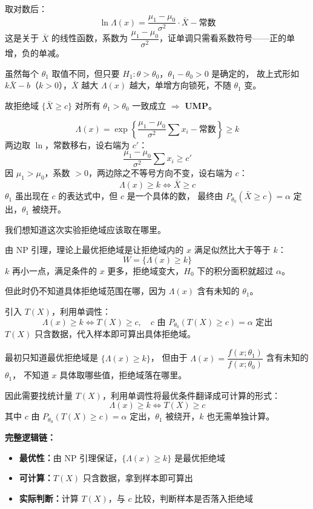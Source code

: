 \begin{note}[单调性的证明]
取对数后：
\[
\ln \Lambda(x) = \frac{\mu_1 - \mu_0}{\sigma^2} \cdot \bar{X} - \text{常数}
\]
这是关于 $\bar{X}$ 的线性函数，系数为 $\dfrac{\mu_1-\mu_0}{\sigma^2}$，证单调只需看系数符号——正的单增，负的单减。

虽然每个 $\theta_1$ 取值不同，但只要 $H_1: \theta > \theta_0$，$\theta_1 - \theta_0 > 0$ 是确定的，
故上式形如 $k\bar{X} - b$（$k > 0$），$\bar{X}$ 越大 $\Lambda(x)$ 越大，单增方向锁死，不随 $\theta_1$ 变。

故拒绝域 $\{\bar{X} \geq c\}$ 对所有 $\theta_1 > \theta_0$ 一致成立 $\Rightarrow$ \textbf{UMP}。
\end{note}




\begin{note}[似然比化简为拒绝域]
\[
\Lambda(x) = \exp\!\left\{\frac{\mu_1-\mu_0}{\sigma^2}\sum x_i - \text{常数}\right\} \geq k
\]
两边取 $\ln$，常数移右，设右端为 $c'$：
\[
\frac{\mu_1-\mu_0}{\sigma^2}\sum x_i \geq c'
\]
因 $\mu_1 > \mu_0$，系数 $> 0$，两边除之不等号方向不变，设右端为 $c$：
\[
\Lambda(x) \geq k \iff \bar{X} \geq c
\]
$\theta_1$ 虽出现在 $c$ 的表达式中，但 $c$ 是一个具体的数，
最终由 $P_{\theta_0}(\bar{X} \geq c) = \alpha$ 定出，$\theta_1$ 被绕开。
\end{note}
\begin{dxtips}[NP到UMP的完整逻辑]
我们想知道这次实验拒绝域应该取在哪里。

由 NP 引理，理论上最优拒绝域是让拒绝域内的 $x$ 满足似然比大于等于 $k$：
\[
W = \{\Lambda(x) \geq k\}
\]
$k$ 再小一点，满足条件的 $x$ 更多，拒绝域变大，$H_0$ 下的积分面积就超过 $\alpha$。

但此时仍不知道具体拒绝域范围在哪，因为 $\Lambda(x)$ 含有未知的 $\theta_1$。

引入 $T(X)$，利用单调性：
\[
\Lambda(x) \geq k \iff T(X) \geq c, \quad c \text{ 由 } P_{\theta_0}(T(X) \geq c) = \alpha \text{ 定出}
\]
$T(X)$ 只含数据，代入样本即可算出具体拒绝域。
\end{dxtips}
\begin{note}[从似然比到可用拒绝域]
最初只知道最优拒绝域是 $\{\Lambda(x) \geq k\}$，
但由于 $\Lambda(x) = \dfrac{f(x;\theta_1)}{f(x;\theta_0)}$ 含有未知的 $\theta_1$，
不知道 $x$ 具体取哪些值，拒绝域落在哪里。

因此需要找统计量 $T(X)$，利用单调性将最优条件翻译成可计算的形式：
\[
\Lambda(x) \geq k \iff T(X) \geq c
\]
其中 $c$ 由 $P_{\theta_0}(T(X) \geq c) = \alpha$ 定出，$\theta_1$ 被绕开，$k$ 也无需单独计算。

\textbf{完整逻辑链：}
\begin{itemize}
    \item \textbf{最优性：}由 NP 引理保证，$\{\Lambda(x) \geq k\}$ 是最优拒绝域
    \item \textbf{可计算：}$T(X)$ 只含数据，拿到样本即可算出
    \item \textbf{实际判断：}计算 $T(X)$，与 $c$ 比较，判断样本是否落入拒绝域
\end{itemize}
\end{note}
